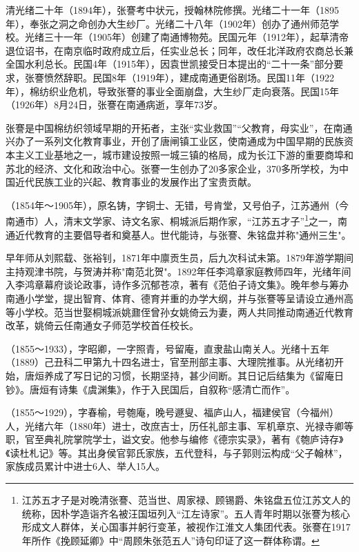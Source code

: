 \begin{description}
        清光绪二十年（1894年），张謇考中状元，授翰林院修撰。光绪二十一年（1895年），奉张之洞之命创办大生纱厂。光绪二十八年（1902年）创办了通州师范学校。光绪三十一年（1905年）创建了南通博物苑。民国元年（1912年），起草清帝退位诏书，在南京临时政府成立后，任实业总长；同年，改任北洋政府农商总长兼全国水利总长。民国4年（1915年），因袁世凯接受日本提出的“二十一条”部分要求，张謇愤然辞职。民国8年（1919年），建成南通更俗剧场。民国11年（1922年），棉纺织业危机，导致张謇的事业全面崩盘，大生纱厂走向衰落。民国15年（1926年）8月24日，张謇在南通病逝，享年73岁。\par
        张謇是中国棉纺织领域早期的开拓者，主张“实业救国”“父教育，母实业”，在南通兴办了一系列文化教育事业，开创了唐闸镇工业区，使南通成为中国早期的民族资本主义工业基地之一，城市建设按照一城三镇的格局，成为长江下游的重要商埠和苏北的经济、文化和政治中心。张謇一生创办了20多家企业，370多所学校，为中国近代民族工业的兴起、教育事业的发展作出了宝贵贡献。
  \item[范当世] （1854年～1905年），原名铸，字铜士、无错，号肯堂，又号伯子，江苏通州（今南通市）人，清末文学家、诗文名家、桐城派后期作家，“江苏五才子”\footnote{江苏五才子是对晚清张謇、范当世、周家禄、顾锡爵、朱铭盘五位江苏文人的统称，因朴学造诣齐名被汪国垣列入“江左诗家”。五人青年时期以张謇为核心形成文人群体，关心国事并躬行变革，被视作江淮文人集团代表。张謇在1917年所作《挽顾延卿》中“周顾朱张范五人”诗句印证了这一群体称谓。}之一，南通近代教育的主要倡导者和奠基人。世代能诗，与张謇、朱铭盘并称"通州三生"。\par
        早年师从刘熙载、张裕钊，1871年中廪贡生员，后九次科试未第。1879年游学期间主持观津书院，与贺涛并称"南范北贺"。1892年任李鸿章家庭教师四年，光绪年间入李鸿章幕府谈论政事，诗作多沉郁苍凉，著有《范伯子诗文集》。晚年参与筹办南通小学堂，提出智育、体育、德育并重的办学大纲，并与张謇等呈请设立通州高等小学校。范当世娶桐城派姚鼐侄曾孙女姚倚云为妻，两人共同推动南通近代教育改革，姚倚云任南通女子师范学校首任校长。
  \item[唐烜] （1855～1933），字昭卿，一字照青，号留庵，直隶盐山南关人。光绪十五年（1889）己丑科二甲第九十四名进士，官至刑部主事、大理院推事。从光绪初开始，唐烜养成了写日记的习惯，长期坚持，甚少间断。其日记后结集为《留庵日钞》。唐烜有诗集《虞渊集》，作于入民国后，自叙称“感清亡而作”。
  \item[郭曾炘] （1855～1929），字春榆，号匏庵，晚号遯叟、福庐山人，福建侯官（今福州）人，光绪六年（1880年）进士，改庶吉士，历任礼部主事、军机章京、光禄寺卿等职，官至典礼院掌院学士，谥文安。他参与编修《德宗实录》，著有《匏庐诗存》《读杜札记》等。其出身侯官郭氏家族，五代登科，与子郭则沄构成“父子翰林”，家族成员累计中进士6人、举人15人。

\end{description}
